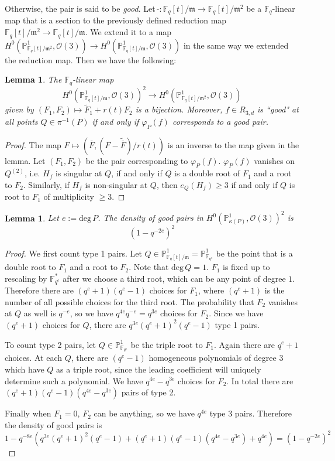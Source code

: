 \documentclass[12pt]{article}
\theoremstyle{plain}
\newtheorem{lemma}[equation]{Lemma}
\theoremstyle{definition}
\newcommand{\fm}{\mathfrak{m}}
\newcommand{\IF}{\mathbb{F}}
\newcommand{\IP}{\mathbb{P}}
\newcommand{\sO}{\mathcal{O}}
\renewcommand{\deg}{\mathrm{deg}\,}
\newcommand\wb{\overline}
\newcommand{\<}{\langle}
\renewcommand{\>}{\rangle}
\def\wt{\widetilde}
\begin{document}
Otherwise, the pair is said to be \textit{good}.
Let $\, \wt{} : \IF_q[t]/\fm \to \IF_q[t]/\fm^2$ be a $\IF_q$-linear map that is a section to the previously defined reduction map $\IF_q[t]/\fm^2 \to \IF_q[t]/\fm$. We extend it to a map $H^0(\IP^1_{\IF_q[t]/\fm^2}, \sO(3)) \to H^0(\IP^1_{\IF_q[t]/\fm}, \sO(3))$ in the same way we extended the reduction map. Then we have the following:
\begin{lemma} 
\label{pair}
The $\IF_q$-linear map 
$$ H^0(\IP^1_{\IF_q[t]/\fm}, \sO(3))^2 \to H^0(\IP^1_{\IF_q[t]/\fm^2}, \sO(3)) $$
given by $(F_1, F_2) \mapsto \wt{F}_1 + r(t)F_2$ is a bijection. Moreover, $f \in R_{3, d}$ is ``good" at all points $Q \in \pi^{-1}(P)$ if and only if $\varphi_P(f)$ corresponds to a good pair. 
\end{lemma}
\begin{proof}
The map $F \mapsto ( \wb{F}, (F - \wt{\wb{F}})/r(t))$ is an inverse to the map given in the lemma. Let $(F_1, F_2)$ be the pair corresponding to $\varphi_P(f)$. $\varphi_P(f)$ vanishes on $Q^{(2)}$, i.e. $H_f$ is singular at $Q$, if and only if $Q$ is a double root of $F_1$ and a root to $F_2$. Similarly, if $H_f$ is non-singular at $Q$, then $e_Q(H_f) \ge 3$ if and only if $Q$ is root to $F_1$ of multiplicity $\ge 3$. 
\end{proof}

\begin{lemma}
\label{count}
Let $e:= \deg P$. The density of good pairs in $H^0(\IP^1_{\kappa(P)}, \sO(3))^2$ is 
$$ (1 - q^{-2e})^{2} $$
\end{lemma}
\begin{proof}
We first count type 1 pairs. Let $Q \in \IP^1_{\IF_q[t]/\fm} = \IP^1_{\IF_{q^e}}$ be the point that is a double root to $F_1$ and a root to $F_2$. Note that $\deg Q = 1$. $F_1$ is fixed up to rescaling by $\IF_{q^e}^*$ after we choose a third root, which can be any point of degree $1$. Therefore there are $(q^e + 1)(q^e - 1)$ choices for $F_1$, where $(q^e + 1)$ is the number of all possible choices for the third root. The probability that $F_2$ vanishes at $Q$ as well is $q^{-e}$, so we have $q^{4e} q^{-e} = q^{3e}$ choices for $F_2$. Since we have $(q^e + 1)$ choices for $Q$, there are $q^{3e}(q^e + 1)^2(q^e - 1)$ type 1 pairs. 

To count type 2 pairs, let $Q \in \IP^1_{\IF_{q^e}}$ be the triple root to $F_1$. Again there are $q^e + 1$ choices. At each $Q$, there are $(q^e -1)$ homogeneous polynomials of degree $3$ which have $Q$ as a triple root, since the leading coefficient will uniquely determine such a polynomial. We have $q^{4e} - q^{3e}$ choices for $F_2$. In total there are $ (q^e + 1)(q^e - 1)(q^{4e} - q^{3e})$
pairs of type 2. 

Finally when $F_1 = 0$, $F_2$ can be anything, so we have $q^{4e}$ type 3 pairs.
Therefore the density of good pairs is 
$$ 1 - q^{-8e}(q^{3e}(q^e + 1)^2(q^e - 1) + (q^e + 1)(q^e - 1)(q^{4e} - q^{3e}) + q^{4e}) = (1 - q^{-2e})^2 $$ 
\end{proof}
\end{document}
